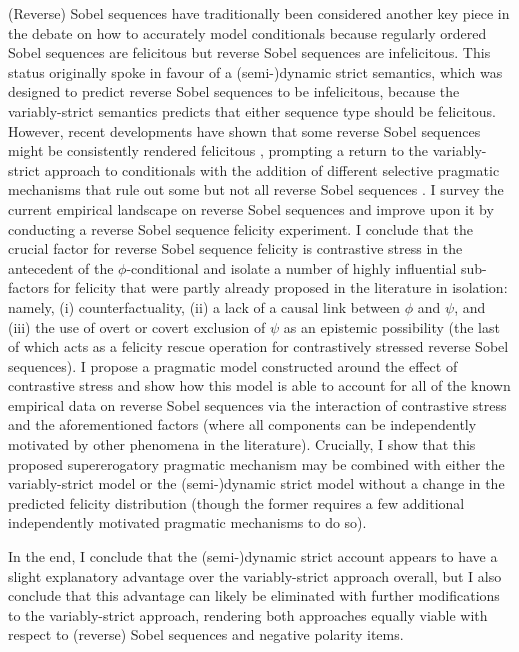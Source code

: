 (Reverse) Sobel sequences have traditionally been considered another key piece in the debate on how to accurately model conditionals because regularly ordered Sobel sequences are felicitous but reverse Sobel sequences are infelicitous. This status originally spoke in favour of a (semi-)dynamic strict semantics, which was designed to predict reverse Sobel sequences to be infelicitous, because the variably-strict semantics predicts that either sequence type should be felicitous. However, recent developments have shown that some reverse Sobel sequences might be consistently rendered felicitous \parencite{Moss2012}, prompting a return to the variably-strict approach to conditionals with the addition of different selective pragmatic mechanisms that rule out some but not all reverse Sobel sequences \parencite{Moss2012,Klecha2014,Klecha2015,Lewis2018,Krassnig2017,Krassnig2020,Krassnig2022,Ippolito2020}. I survey the current empirical landscape on reverse Sobel sequences and improve upon it by conducting a reverse Sobel sequence felicity experiment. I conclude that the crucial factor for reverse Sobel sequence felicity is contrastive stress in the antecedent of the $\phi$-conditional and isolate a number of highly influential sub-factors for felicity that were partly already proposed in the literature in isolation: namely, (i) counterfactuality, (ii) a lack of a causal link between $\phi$ and $\psi$, and (iii) the use of overt or covert exclusion of $\psi$ as an epistemic possibility (the last of which acts as a felicity rescue operation for contrastively stressed reverse Sobel sequences). I propose a pragmatic model constructed around the effect of contrastive stress and show how this model is able to account for all of the known empirical data on reverse Sobel sequences via the interaction of contrastive stress and the aforementioned factors (where all components can be independently motivated by other phenomena in the literature). Crucially, I show that this proposed supererogatory pragmatic mechanism may be combined with either the variably-strict model or the (semi-)dynamic strict model without a change in the predicted felicity distribution (though the former requires a few additional independently motivated pragmatic mechanisms to do so).

In the end, I conclude that the (semi-)dynamic strict account appears to have a slight explanatory advantage over the variably-strict approach overall, but I also conclude that this advantage can likely be eliminated with further modifications to the variably-strict approach, rendering both approaches equally viable with respect to (reverse) Sobel sequences and negative polarity items.


